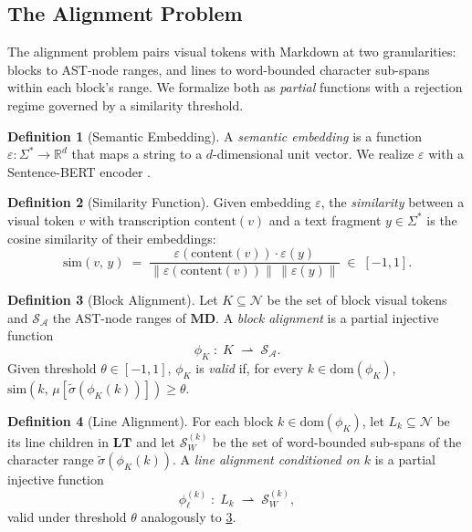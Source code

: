 \documentclass{article}
\theoremstyle{definition}
\newtheorem{definition}{Definition}[section]
\newcommand{\LT}{\mathbf{LT}}
\newcommand{\MD}{\mathbf{MD}}
\newcommand{\Nodes}{\mathcal{N}}
\newcommand{\Spans}{\mathcal{S}}
\begin{document}
\subsection{The Alignment Problem}

The alignment problem pairs visual tokens with Markdown at two granularities:
blocks to AST-node ranges, and lines to word-bounded character sub-spans
within each block's range.  We formalize both as \emph{partial} functions
with a rejection regime governed by a similarity threshold.

\begin{definition}[Semantic Embedding]
      A \emph{semantic embedding} is a function
      $\varepsilon : \Sigma^{*} \to \mathbb{R}^{d}$ that maps a string to a
      $d$-dimensional unit vector.  We realize $\varepsilon$ with a
      Sentence-BERT encoder \cite{reimers2019sbert, wang2020minilm}.
\end{definition}

\begin{definition}[Similarity Function]
      Given embedding $\varepsilon$, the \emph{similarity} between a visual
      token $v$ with transcription $\mathrm{content}(v)$ and a text fragment
      $y \in \Sigma^{*}$ is the cosine similarity of their embeddings:
      \[
            \mathrm{sim}(v,\, y) \;=\;
            \frac{\varepsilon(\mathrm{content}(v)) \cdot \varepsilon(y)}
            {\lVert \varepsilon(\mathrm{content}(v)) \rVert\,
                  \lVert \varepsilon(y) \rVert}
            \;\in\; [-1, 1].
      \]
\end{definition}

\begin{definition}[Block Alignment]
      \label{def:block-align}
      Let $K \subseteq \Nodes$ be the set of block visual tokens and
      $\Spans_{\mathcal{A}}$ the AST-node ranges of $\MD$.  A \emph{block
            alignment} is a partial injective function
      \[
            \phi_K \;:\; K \;\rightharpoonup\; \Spans_{\mathcal{A}}.
      \]
      Given threshold $\theta \in [-1, 1]$, $\phi_K$ is \emph{valid} if, for
      every $k \in \mathrm{dom}(\phi_K)$,
      $\mathrm{sim}(k,\, \mu[\widetilde{\sigma}(\phi_K(k))]) \ge \theta$.
\end{definition}

\begin{definition}[Line Alignment]
      \label{def:line-align}
      For each block $k \in \mathrm{dom}(\phi_K)$, let $L_k \subseteq \Nodes$
      be its line children in $\LT$ and let $\Spans_{W}^{(k)}$ be the set of
      word-bounded sub-spans of the character range
      $\widetilde{\sigma}(\phi_K(k))$.  A \emph{line alignment conditioned on
            $k$} is a partial injective function
      \[
            \phi_\ell^{(k)} \;:\; L_k \;\rightharpoonup\; \Spans_{W}^{(k)},
      \]
      valid under threshold $\theta$ analogously to \cref{def:block-align}.
\end{definition}
\end{document}
